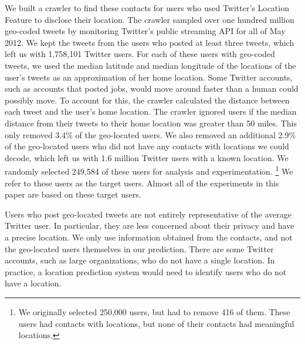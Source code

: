 We built a crawler to find these contacts for users who used Twitter's Location
Feature to disclose their location.
%
The crawler sampled over one hundred million geo-coded tweets by monitoring
Twitter's public streaming API for all of May 2012.
We kept the tweets from the users who posted at least three tweets, which left
us with 1,758,101 Twitter users.
%
For each of these users with geo-coded tweets, we used the median latitude and
median longitude of the locations of the user's tweets as an approximation of
her home location.
%
Some Twitter accounts, such as accounts that posted jobs, would
move around faster than a human could possibly move.
%
To account for this, the crawler calculated the distance between each tweet and
the user's home location.
%
The crawler ignored users if the median distance from their tweets to their
home location was greater than 50 miles.
%
This only removed 3.4\% of the geo-located users.
%
We also removed an additional 2.9\% of the geo-located users who did not have
any contacts with locations we could decode, which left us with 1.6 million
Twitter users with a known location.
%
We randomly selected 249,584 of these users for analysis and experimentation.
\footnote{We originally selected 250,000 users, but had to remove 416 of them.
These users had contacts with locations, but none of their contacts had
meaningful locations.}
%
We refer to these users as the target users.
%
Almost all of the experiments in this paper are based on these target
users.

Users who post geo-located tweets are not entirely representative of the
average Twitter user.
%
In particular, they are less concerned about their privacy and have a precise
location.
%
We only use information obtained from the contacts, and not the geo-located
users themselves in our prediction.
%
There are some Twitter accounts, such as large organizations, who do not have a
single location.
%
In practice, a location prediction system would need to identify users who do
not have a location.





